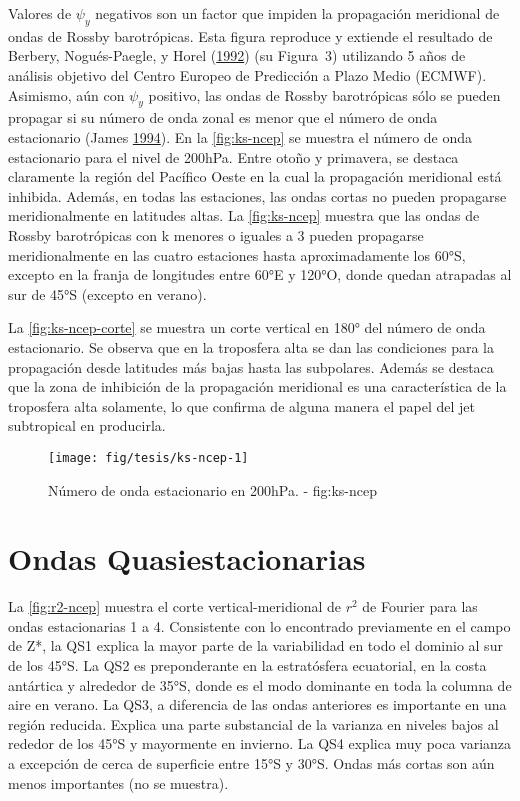\documentclass[spanish,a4paper,12p]{book}
\begin{document}
Valores de \(\psi_y\) negativos son un factor que impiden la propagación
meridional de ondas de Rossby barotrópicas. Esta figura reproduce y
extiende el resultado de Berbery, Nogués-Paegle, y Horel
(\protect\hyperlink{ref-Berbery1992}{1992}) (su Figura~3) utilizando 5
años de análisis objetivo del Centro Europeo de Predicción a Plazo Medio
(ECMWF). Asimismo, aún con \(\psi_y\) positivo, las ondas de Rossby
barotrópicas sólo se pueden propagar si su número de onda zonal es menor
que el número de onda estacionario (James
\protect\hyperlink{ref-James}{1994}). En la \autoref{fig:ks-ncep} se
muestra el número de onda estacionario para el nivel de 200hPa. Entre
otoño y primavera, se destaca claramente la región del Pacífico Oeste en
la cual la propagación meridional está inhibida. Además, en todas las
estaciones, las ondas cortas no pueden propagarse meridionalmente en
latitudes altas. La \autoref{fig:ks-ncep} muestra que las ondas de
Rossby barotrópicas con k menores o iguales a 3 pueden propagarse
meridionalmente en las cuatro estaciones hasta aproximadamente los 60°S,
excepto en la franja de longitudes entre 60°E y 120°O, donde quedan
atrapadas al sur de 45°S (excepto en verano).

La \autoref{fig:ks-ncep-corte} se muestra un corte vertical en 180° del
número de onda estacionario. Se observa que en la troposfera alta se dan
las condiciones para la propagación desde latitudes más bajas hasta las
subpolares. Además se destaca que la zona de inhibición de la
propagación meridional es una característica de la troposfera alta
solamente, lo que confirma de alguna manera el papel del jet subtropical
en producirla.

\begin{landscape}\begin{figure}

{\centering \texttt{[image: fig/tesis/ks-ncep-1]} 

}

\caption{Número de onda estacionario en 200hPa. - fig:ks-ncep}\label{fig:ks-ncep}
\end{figure}
\end{landscape}

\section{Ondas Quasiestacionarias}\label{ondas-quasiestacionarias}

La \autoref{fig:r2-ncep} muestra el corte vertical-meridional de \(r^2\)
de Fourier para las ondas estacionarias 1 a 4. Consistente con lo
encontrado previamente en el campo de Z*, la QS1 explica la mayor parte
de la variabilidad en todo el dominio al sur de los 45°S. La QS2 es
preponderante en la estratósfera ecuatorial, en la costa antártica y
alrededor de 35°S, donde es el modo dominante en toda la columna de aire
en verano. La QS3, a diferencia de las ondas anteriores es importante en
una región reducida. Explica una parte substancial de la varianza en
niveles bajos al rededor de los 45°S y mayormente en invierno. La QS4
explica muy poca varianza a excepción de cerca de superficie entre 15°S
y 30°S. Ondas más cortas son aún menos importantes (no se muestra).
\end{document}

